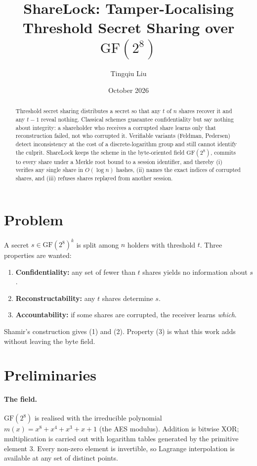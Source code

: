 \documentclass[11pt]{article}
\title{ShareLock: Tamper-Localising Threshold Secret Sharing over $\mathrm{GF}(2^8)$}
\author{Tingqiu Liu}
\date{October 2026}
\begin{document}
\maketitle

\begin{abstract}
Threshold secret sharing distributes a secret so that any $t$ of $n$ shares recover it and any
$t-1$ reveal nothing. Classical schemes guarantee confidentiality but say nothing about integrity:
a shareholder who receives a corrupted share learns only that reconstruction failed, not who
corrupted it. Verifiable variants (Feldman, Pedersen) detect inconsistency at the cost of a
discrete-logarithm group and still cannot identify the culprit. ShareLock keeps the scheme in the
byte-oriented field $\mathrm{GF}(2^8)$, commits to every share under a Merkle root bound to a
session identifier, and thereby (i) verifies any single share in $O(\log n)$ hashes, (ii) names the
exact indices of corrupted shares, and (iii) refuses shares replayed from another session.
\end{abstract}

\section{Problem}
A secret $s \in \mathrm{GF}(2^8)^k$ is split among $n$ holders with threshold $t$. Three properties
are wanted:
\begin{enumerate}
  \item \textbf{Confidentiality:} any set of fewer than $t$ shares yields no information about $s$.
  \item \textbf{Reconstructability:} any $t$ shares determine $s$.
  \item \textbf{Accountability:} if some shares are corrupted, the receiver learns \emph{which}.
\end{enumerate}
Shamir's construction gives (1) and (2). Property (3) is what this work adds without leaving the byte field.

\section{Preliminaries}
\paragraph{The field.} $\mathrm{GF}(2^8)$ is realised with the irreducible polynomial
$m(x) = x^8 + x^4 + x^3 + x + 1$ (the AES modulus). Addition is bitwise XOR; multiplication is
carried out with logarithm tables generated by the primitive element $3$. Every non-zero element is
invertible, so Lagrange interpolation is available at any set of distinct points.
\end{document}
